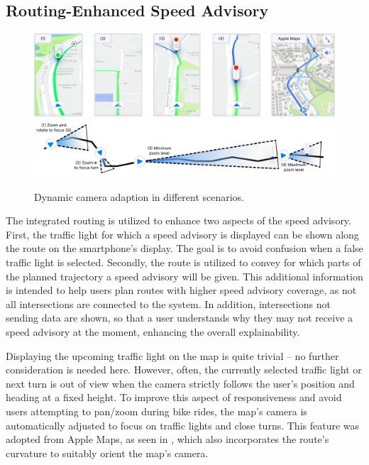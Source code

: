 \subsection{Routing-Enhanced Speed Advisory}

\begin{figure}[t]
\centering
\includegraphics[width=\linewidth]{images/camera-controller-1.png}
\includegraphics[width=\linewidth]{images/camera-controller-2.pdf}
\caption{Dynamic camera adaption in different scenarios.}
\label{fig:camera-controller}
\end{figure}

The integrated routing is utilized to enhance two aspects of the speed advisory. First, the traffic light for which a speed advisory is displayed can be shown along the route on the smartphone's display. The goal is to avoid confusion when a false traffic light is selected. Secondly, the route is utilized to convey for which parts of the planned trajectory a speed advisory will be given. This additional information is intended to help users plan routes with higher speed advisory coverage, as not all intersections are connected to the system. In addition, intersections not sending data are shown, so that a user understands why they may not receive a speed advisory at the moment, enhancing the overall explainability.

Displaying the upcoming traffic light on the map is quite trivial -- no further consideration is needed here. However, often, the currently selected traffic light or next turn is out of view when the camera strictly follows the user's position and heading at a fixed height. To improve this aspect of responsiveness and avoid users attempting to pan/zoom during bike rides, the map's camera is automatically adjusted to focus on traffic lights and close turns. This feature was adopted from Apple Maps, as seen in , which also incorporates the route's curvature to suitably orient the map's camera.

